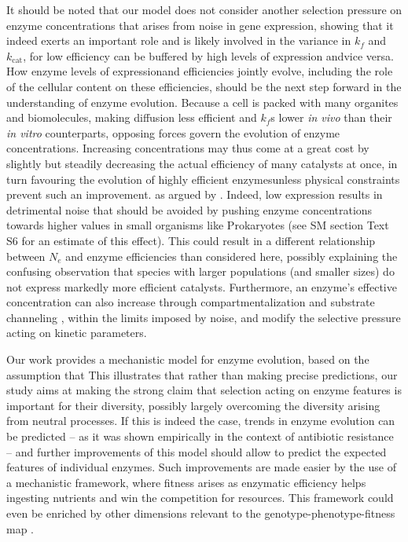 \documentclass[11pt,onecolumn]{article}
\providecommand{\DIFadd}[1]{{\protect\color{blue} \sf #1}} %
\providecommand{\DIFdel}[1]{{\protect\color{red} \scriptsize #1}} %
\providecommand{\DIFaddbegin}{} %
\providecommand{\DIFaddend}{} %
\providecommand{\DIFdelbegin}{} %
\providecommand{\DIFdelend}{} %
\begin{document}
\DIFadd{It should be noted that our model does not consider another selection pressure on enzyme concentrations that arises from noise in gene expression}\DIFaddend , \DIFdelbegin \DIFdel{showing that it indeed exerts an important role and is likely involved in the variance in $k_f$ and $k_\text{cat}$, for low efficiency can be buffered by high levels of expression andvice versa.
How enzyme levels of expressionand efficiencies jointly evolve, including the role of the cellular content on these efficiencies, should be the next step forward in the understanding of enzyme evolution. Because a cell is packed with many organites and biomolecules, making diffusion less efficient and $k_f$s lower \textit{in vivo} than their \textit{in vitro} counterparts, opposing forces govern the evolution of enzyme concentrations. Increasing concentrations may thus come at a great cost by slightly but steadily decreasing the actual efficiency of many catalysts at once, in turn favouring the evolution of highly efficient enzymesunless physical constraints prevent such an improvement. }\DIFdelend \DIFaddbegin \DIFadd{as argued by \citet{Wang11}. Indeed, low expression results in detrimental noise that should be avoided by pushing enzyme concentrations towards higher values in small organisms like Prokaryotes (see SM section Text S6 for an estimate of this effect). This could result in a different relationship between $N_e$ and enzyme efficiencies than considered here, possibly explaining the confusing observation that species with larger populations (and smaller sizes) do not express markedly more efficient catalysts. Furthermore, an enzyme's effective concentration can also increase through compartmentalization \citep{Ovadi04,Diekmann13,Cornejo14} and substrate channeling \citep{Welch94,Huang01,Sweetlove18}, within the limits imposed by noise, and modify the selective pressure acting on kinetic parameters.
}\DIFaddend 

\DIFdelbegin \DIFdel{Our work provides a mechanistic model for enzyme evolution, based on the assumption that }\DIFdelend \DIFaddbegin \DIFadd{This illustrates that rather than making precise predictions, our study aims at making the strong claim that selection acting on enzyme features is important for their diversity, possibly largely overcoming the diversity arising from neutral processes. If this is indeed the case, trends in enzyme evolution can be predicted -- as it was shown empirically in the context of antibiotic resistance \citep{Walkiewicz12} -- and further improvements of this model should allow to predict the expected features of individual enzymes. Such improvements are made easier by the use of a mechanistic framework, where fitness arises as }\DIFaddend enzymatic efficiency helps ingesting nutrients and win the competition for resources. \DIFaddbegin \DIFadd{This framework could even be enriched by other dimensions relevant to the genotype-phenotype-fitness map \citep{Bershtein17,Echave19,Kinsler20}. 
}
\end{document}
